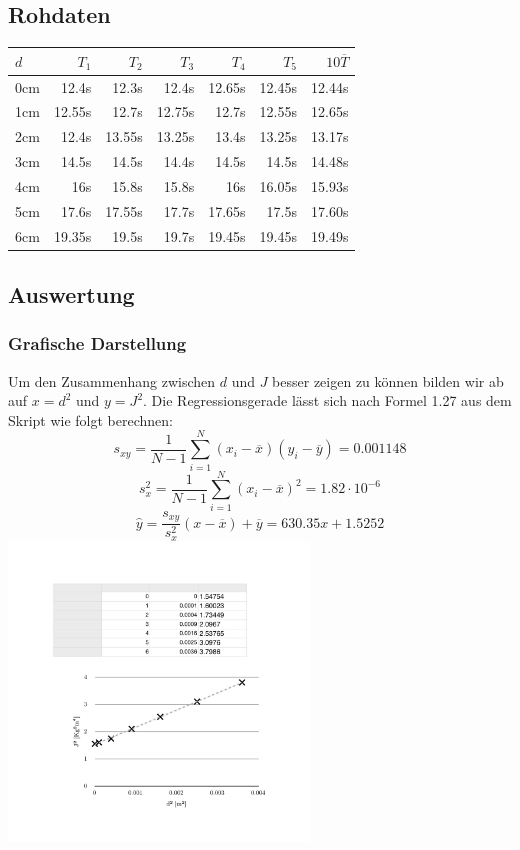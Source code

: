 \documentclass[12pt,a4paper]{article}
\begin{document}
\subsection*{Rohdaten}
\begin{tabular}{|l|r|r|r|r|r|r|}
\hline
$d$&$T_1$&$T_2$&$T_3$&$T_4$&$T_5$&$10\overline{T}$\\
\hline
0cm&12.4s&12.3s&12.4s&12.65s&12.45s&12.44s\\
1cm&12.55s&12.7s&12.75s&12.7s&12.55s&12.65s\\
2cm&12.4s&13.55s&13.25s&13.4s&13.25s&13.17s\\
3cm&14.5s&14.5s&14.4s&14.5s&14.5s&14.48s\\
4cm&16s&15.8s&15.8s&16s&16.05s&15.93s\\
5cm&17.6s&17.55s&17.7s&17.65s&17.5s&17.60s\\
6cm&19.35s&19.5s&19.7s&19.45s&19.45s&19.49s\\
\hline
\end{tabular}

\subsection*{Auswertung}
\subsubsection*{Grafische Darstellung}
Um den Zusammenhang zwischen $d$ und $J$ besser zeigen zu k\"onnen bilden wir ab auf $x = d^2$ und $y = J^2$.
Die Regressionsgerade l\"asst sich nach Formel 1.27 aus dem Skript wie folgt berechnen:
\[ s_{xy} = \frac{1}{N - 1}\sum_{i=1}^{N}(x_i - \overline{x})(y_i - \overline{y}) =  0.001148 \]
\[ s_x^2 = \frac{1}{N - 1}\sum_{i=1}^{N}(x_i - \overline{x})^2 =  1.82\cdot 10^{-6} \]
\[ \hat{y} = \frac{s_{xy}}{s_x^2}(x - \overline{x}) + \overline{y} = 630.35x + 1.5252 \]
\includegraphics[width=8cm]{diagram.pdf}
\end{document}
